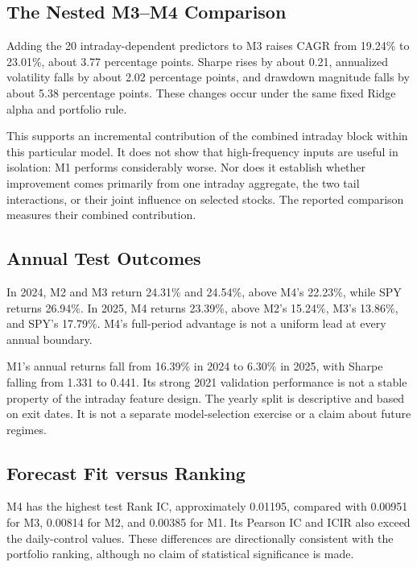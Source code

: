 \documentclass[11pt,a4paper]{article}
\newcommand{\tbl}[3]{\begin{table}[htbp]\centering\small
\caption{#2}\label{#3}#1\end{table}}
\begin{document}
\subsection{The Nested M3--M4 Comparison}
Adding the 20 intraday-dependent predictors to M3 raises CAGR from 19.24\%
to 23.01\%, about 3.77 percentage points. Sharpe rises by about 0.21,
annualized volatility falls by about 2.02 percentage points, and drawdown
magnitude falls by about 5.38 percentage points. These changes occur under
the same fixed Ridge alpha and portfolio rule.

This supports an incremental contribution of the combined intraday block
within this particular model. It does not show that high-frequency inputs
are useful in isolation: M1 performs considerably worse. Nor does it establish
whether improvement comes primarily from one intraday aggregate, the two
tail interactions, or their joint influence on selected stocks.
The reported comparison measures their combined contribution.



\subsection{Annual Test Outcomes}
\tbl{\AnnualTable}{Annual subdivisions of the test path at 5 bps per side.
Returns are realized segment totals; SR is the annualized Sharpe within that segment.}
{tab:annual}
In 2024, M2 and M3 return 24.31\% and 24.54\%, above M4's 22.23\%, while
SPY returns 26.94\%. In 2025, M4 returns 23.39\%, above M2's 15.24\%,
M3's 13.86\%, and SPY's 17.79\%. M4's full-period advantage is not a uniform
lead at every annual boundary.

M1's annual returns fall from 16.39\% in 2024 to 6.30\% in 2025, with Sharpe
falling from 1.331 to 0.441. Its strong 2021 validation performance is not a
stable property of the intraday feature design. The yearly split is descriptive
and based on exit dates. It is not a separate model-selection exercise or
a claim about future regimes.

\subsection{Forecast Fit versus Ranking}
\tbl{\PredictionTable}{Test-period forecast metrics for the main models.
ICIR is not annualized; $R^2$ is dimensionless.}{tab:prediction}


M4 has the highest test Rank IC, approximately 0.01195, compared with 0.00951
for M3, 0.00814 for M2, and 0.00385 for M1. Its Pearson IC and ICIR also exceed
the daily-control values. These differences are directionally consistent
with the portfolio ranking, although no claim of statistical significance is made.
\end{document}
